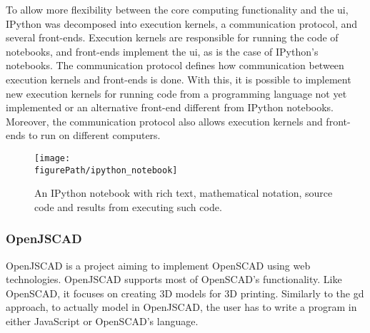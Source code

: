 
To allow more flexibility between the core computing functionality and the \gls{ui}, IPython was decomposed into execution kernels, a communication protocol, and several front-ends.
Execution kernels are responsible for running the code of notebooks, and front-ends implement the \gls{ui}, as is the case of IPython's notebooks.
The communication protocol defines how communication between execution kernels and front-ends is done.
With this, it is possible to implement new execution kernels for running code from a programming language not yet implemented or an alternative front-end different from IPython notebooks.
Moreover, the communication protocol also allows execution kernels and front-ends to run on different computers\cite{PER-GRA:2007}.


\begin{figure}
	\centering
	\texttt{[image: \\figurePath/ipython\_notebook]}
	\caption{An IPython notebook with rich text, mathematical notation, source code and results from executing such code.}
	\label{fig:ipython:notebook}
\end{figure}


\subsubsection{OpenJSCAD}
OpenJSCAD\cite{openjscad2015site} is a project aiming to implement OpenSCAD\cite{kintel2011openscad} using web technologies.
OpenJSCAD supports most of OpenSCAD's functionality.
Like OpenSCAD, it focuses on creating 3D models for 3D printing.
Similarly to the \gls{gd} approach, to actually model in OpenJSCAD, the user has to write a program in either JavaScript or OpenSCAD's language.

